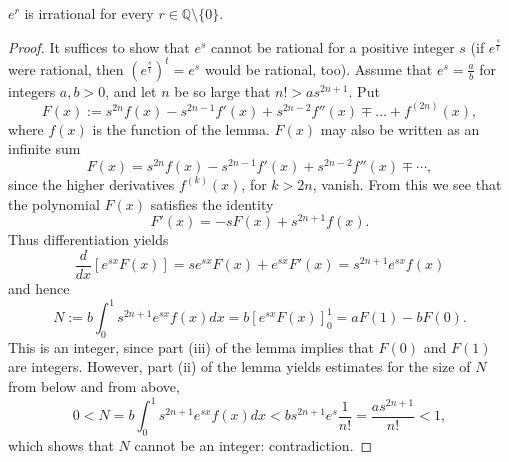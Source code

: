 \begin{theorem}
  \label{e_pow_irrational}
  \label{book.irrational.Theorem_1}
  \leanok
  $e^r$ is irrational for every $r \in \mathbb{Q} \setminus \{0\}$.
\end{theorem}
\begin{proof}
  It suffices to show that $e^s$ cannot be rational for a positive integer $s$ (if $e^{\frac{s}{t}}$ were rational, then $\left(e^{\frac{s}{t}}\right)^t = e^s$ would be rational, too).
  Assume that $e^s = \frac{a}{b}$ for integers $a, b > 0$, and let $n$ be so large that $n! > a s^{2n+1}$.
  Put
  \[
  F(x) := s^{2n} f(x) - s^{2n-1} f'(x) + s^{2n-2} f''(x) \mp \dots + f^{(2n)}(x),
  \]
  where $f(x)$ is the function of the lemma.
  $F(x)$ may also be written as an infinite sum
  \[
  F(x) = s^{2n} f(x) - s^{2n-1} f'(x) + s^{2n-2} f''(x) \mp \cdots,
  \]
  since the higher derivatives $f^{(k)}(x)$, for $k > 2n$, vanish.
  From this we see that the polynomial $F(x)$ satisfies the identity
  \[
  F'(x) = -s F(x) + s^{2n+1} f(x).
  \]
  Thus differentiation yields
  \[
  \frac{d}{dx} [e^{sx} F(x)] = s e^{sx} F(x) + e^{sx} F'(x) = s^{2n+1} e^{sx} f(x)
  \]
  and hence
  \[
  N := b \int_0^1 s^{2n+1} e^{sx} f(x) dx = b [e^{sx} F(x)]_0^1 = a F(1) - b F(0).
  \]
  This is an integer, since part (iii) of the lemma implies that $F(0)$ and $F(1)$ are integers.
  However, part (ii) of the lemma yields estimates for the size of $N$ from below and from above,
  \[
  0 < N = b \int_0^1 s^{2n+1} e^{sx} f(x) dx < b s^{2n+1} e^s \frac{1}{n!} = \frac{a s^{2n+1}}{n!} < 1,
  \]
  which shows that $N$ cannot be an integer: contradiction.
\end{proof}



